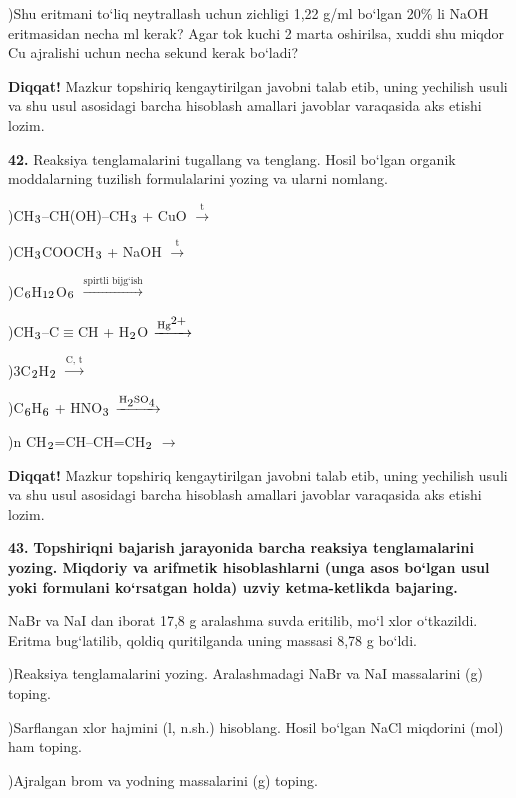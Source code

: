 \documentclass[11pt,a4paper]{article}
\renewcommand{\textsubscript}[1]{\ensuremath{_{\text{\fontsize{8}{8}\selectfont #1}}}}
\renewcommand{\textsuperscript}[1]{\ensuremath{^{\text{\fontsize{8}{8}\selectfont #1}}}}
\newcommand{\diqqat}[1]{\par\smallskip\noindent\textbf{Diqqat!} #1\par\medskip}
\begin{document}
)Shu eritmani to`liq neytrallash uchun zichligi 1,22 g/ml bo`lgan 20\% li NaOH eritmasidan necha ml kerak? Agar tok kuchi 2 marta oshirilsa, xuddi shu miqdor Cu ajralishi uchun necha sekund kerak bo`ladi?\par
\diqqat{Mazkur topshiriq kengaytirilgan javobni talab etib, uning yechilish usuli va shu usul asosidagi barcha hisoblash amallari javoblar varaqasida aks etishi lozim.}
\noindent\textbf{42.} Reaksiya tenglamalarini tugallang va tenglang. Hosil bo`lgan organik moddalarning tuzilish formulalarini yozing va ularni nomlang.\par
{})CH\textsubscript{3}--CH(OH)--CH\textsubscript{3} + CuO $\xrightarrow{\text{t}}$\par
{})CH\textsubscript{3}COOCH\textsubscript{3} + NaOH $\xrightarrow{\text{t}}$\par
{})C\textsubscript{6}H\textsubscript{12}O\textsubscript{6} $\xrightarrow{\text{spirtli bijg`ish}}$\par
{})CH\textsubscript{3}--C$\equiv$CH + H\textsubscript{2}O $\xrightarrow{\text{Hg\textsuperscript{2+}}}$\par
{})3C\textsubscript{2}H\textsubscript{2} $\xrightarrow{\text{C, t}}$\par
{})C\textsubscript{6}H\textsubscript{6} + HNO\textsubscript{3} $\xrightarrow{\text{H\textsubscript{2}SO\textsubscript{4}}}$\par
{})n CH\textsubscript{2}=CH--CH=CH\textsubscript{2} $\to$\par
\diqqat{Mazkur topshiriq kengaytirilgan javobni talab etib, uning yechilish usuli va shu usul asosidagi barcha hisoblash amallari javoblar varaqasida aks etishi lozim.}
\noindent\textbf{43.} \textbf{Topshiriqni bajarish jarayonida barcha reaksiya tenglamalarini yozing. Miqdoriy va arifmetik hisoblashlarni (unga asos bo`lgan usul yoki formulani ko`rsatgan holda) uzviy ketma-ketlikda bajaring.}\par\smallskip
NaBr va NaI dan iborat 17,8 g aralashma suvda eritilib, mo`l xlor o`tkazildi. Eritma bug`latilib, qoldiq quritilganda uning massasi 8,78 g bo`ldi.\par
{})Reaksiya tenglamalarini yozing. Aralashmadagi NaBr va NaI massalarini (g) toping.\par
{})Sarflangan xlor hajmini (l, n.sh.) hisoblang. Hosil bo`lgan NaCl miqdorini (mol) ham toping.\par
{})Ajralgan brom va yodning massalarini (g) toping.\par
\end{document}
